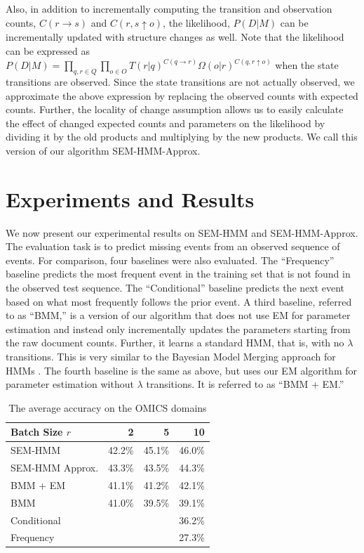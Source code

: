 \documentclass[letterpaper]{article}
\begin{document}
Also, in addition to incrementally computing the transition and observation counts, $C(r \rightarrow s)$ and $C(r,s \uparrow o)$, the likelihood, $P(D|M)$ can be incrementally updated with structure changes as well. Note that the likelihood can be expressed as $P(D|M) = \prod_{q, r \in Q} \prod_{o \in O} T(r|q)^{C(q \rightarrow r)} \Omega(o|r)^{C(q,r \uparrow o)}$ when the state transitions are observed. Since the state transitions are not actually observed, we approximate the above expression by replacing the observed counts with expected counts. Further, the locality of change assumption allows us to easily
calculate the effect of changed expected counts and parameters on the likelihood by dividing it by the old products and multiplying by the new products. We call this version of our algorithm SEM-HMM-Approx.

\section{Experiments and Results}

We now present our experimental results on SEM-HMM and SEM-HMM-Approx. The
evaluation task is to predict missing events from an observed sequence of events.
For comparison, four baselines were also evaluated.  The ``Frequency'' baseline predicts the most frequent event in the training set that is not found in the observed test sequence. The ``Conditional'' baseline predicts the next event based on what most frequently follows the prior event.  %
\vspace{-1.61mm}
A third baseline, referred to as ``BMM,'' is a version of our algorithm that does not use EM for parameter estimation and instead only incrementally updates the parameters starting from the raw document counts. Further, it learns a standard HMM, that is, with no $\lambda$ transitions.
This is very similar to the Bayesian Model Merging approach for HMMs \cite{stolcke1994best}.
The fourth baseline is the same as above, but uses our EM algorithm for parameter estimation without $\lambda$ transitions. It is referred to as ``BMM + EM.''

\begin{table}
\footnotesize
\begin{center}
\begin{tabular}{|l|r|r|r|}
\hline
Batch Size $r$ & 2 & 5 & 10\\
\hline
SEM-HMM & 42.2\% & 45.1\% & 46.0\%\\
SEM-HMM Approx.& 43.3\% & 43.5\% & 44.3\%\\
BMM + EM & 41.1\% & 41.2\% & 42.1\%\\
BMM & 41.0\% & 39.5\% & 39.1\%\\
\hline
Conditional & \multicolumn{3}{r|}{36.2\%}\\
Frequency & \multicolumn{3}{r|}{27.3\%}\\
\hline
\end{tabular}
\caption{The average accuracy on the OMICS domains}
\end{center}
\label{table:omics}
\end{table}
\end{document}
